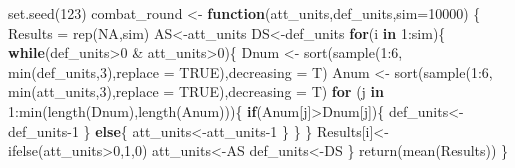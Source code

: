 \documentclass[
]{article}
\newenvironment{Shaded}{\begin{snugshade}}{\end{snugshade}}
\newcommand{\AttributeTok}[1]{\textcolor[rgb]{0.77,0.63,0.00}{#1}}
\newcommand{\ConstantTok}[1]{\textcolor[rgb]{0.00,0.00,0.00}{#1}}
\newcommand{\ControlFlowTok}[1]{\textcolor[rgb]{0.13,0.29,0.53}{\textbf{#1}}}
\newcommand{\DecValTok}[1]{\textcolor[rgb]{0.00,0.00,0.81}{#1}}
\newcommand{\FunctionTok}[1]{\textcolor[rgb]{0.00,0.00,0.00}{#1}}
\newcommand{\NormalTok}[1]{#1}
\newcommand{\OtherTok}[1]{\textcolor[rgb]{0.56,0.35,0.01}{#1}}
\newcommand{\SpecialCharTok}[1]{\textcolor[rgb]{0.00,0.00,0.00}{#1}}
\begin{document}
\begin{Shaded}
\begin{Highlighting}[]
\FunctionTok{set.seed}\NormalTok{(}\DecValTok{123}\NormalTok{)}
\NormalTok{combat\_round }\OtherTok{\textless{}{-}} \ControlFlowTok{function}\NormalTok{(att\_units,def\_units,}\AttributeTok{sim=}\DecValTok{10000}\NormalTok{) \{}
\NormalTok{  Results }\OtherTok{=} \FunctionTok{rep}\NormalTok{(}\ConstantTok{NA}\NormalTok{,sim)}
\NormalTok{  AS}\OtherTok{\textless{}{-}}\NormalTok{att\_units}
\NormalTok{  DS}\OtherTok{\textless{}{-}}\NormalTok{def\_units}
  \ControlFlowTok{for}\NormalTok{(i }\ControlFlowTok{in} \DecValTok{1}\SpecialCharTok{:}\NormalTok{sim)\{}
    \ControlFlowTok{while}\NormalTok{(def\_units}\SpecialCharTok{\textgreater{}}\DecValTok{0} \SpecialCharTok{\&}\NormalTok{ att\_units}\SpecialCharTok{\textgreater{}}\DecValTok{0}\NormalTok{)\{}
\NormalTok{      Dnum }\OtherTok{\textless{}{-}} \FunctionTok{sort}\NormalTok{(}\FunctionTok{sample}\NormalTok{(}\DecValTok{1}\SpecialCharTok{:}\DecValTok{6}\NormalTok{, }\FunctionTok{min}\NormalTok{(def\_units,}\DecValTok{3}\NormalTok{),}\AttributeTok{replace =} \ConstantTok{TRUE}\NormalTok{),}\AttributeTok{decreasing =}\NormalTok{ T)}
\NormalTok{      Anum }\OtherTok{\textless{}{-}} \FunctionTok{sort}\NormalTok{(}\FunctionTok{sample}\NormalTok{(}\DecValTok{1}\SpecialCharTok{:}\DecValTok{6}\NormalTok{, }\FunctionTok{min}\NormalTok{(att\_units,}\DecValTok{3}\NormalTok{),}\AttributeTok{replace =} \ConstantTok{TRUE}\NormalTok{),}\AttributeTok{decreasing =}\NormalTok{ T)}
      \ControlFlowTok{for}\NormalTok{ (j }\ControlFlowTok{in} \DecValTok{1}\SpecialCharTok{:}\FunctionTok{min}\NormalTok{(}\FunctionTok{length}\NormalTok{(Dnum),}\FunctionTok{length}\NormalTok{(Anum)))\{}
        \ControlFlowTok{if}\NormalTok{(Anum[j]}\SpecialCharTok{\textgreater{}}\NormalTok{Dnum[j])\{}
\NormalTok{          def\_units}\OtherTok{\textless{}{-}}\NormalTok{def\_units}\DecValTok{{-}1}
\NormalTok{        \}}
        \ControlFlowTok{else}\NormalTok{\{}
\NormalTok{          att\_units}\OtherTok{\textless{}{-}}\NormalTok{att\_units}\DecValTok{{-}1}
\NormalTok{        \}}
\NormalTok{      \}}
\NormalTok{    \}}
\NormalTok{    Results[i]}\OtherTok{\textless{}{-}} \FunctionTok{ifelse}\NormalTok{(att\_units}\SpecialCharTok{\textgreater{}}\DecValTok{0}\NormalTok{,}\DecValTok{1}\NormalTok{,}\DecValTok{0}\NormalTok{)}
\NormalTok{    att\_units}\OtherTok{\textless{}{-}}\NormalTok{AS}
\NormalTok{    def\_units}\OtherTok{\textless{}{-}}\NormalTok{DS}
\NormalTok{  \}}
  \FunctionTok{return}\NormalTok{(}\FunctionTok{mean}\NormalTok{(Results))}
\NormalTok{\}}


\end{Highlighting}
\end{Shaded}
\end{document}
